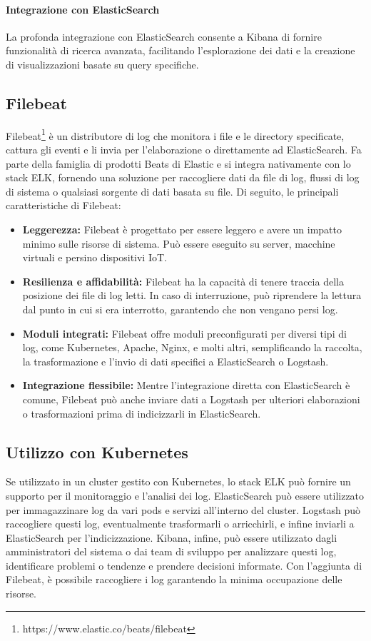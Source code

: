 \paragraph{Integrazione con ElasticSearch}

La profonda integrazione con ElasticSearch consente a Kibana di fornire funzionalità di ricerca avanzata, facilitando l'esplorazione dei dati e la creazione di visualizzazioni basate su query specifiche.


\subsection{Filebeat}

Filebeat\footnote{https://www.elastic.co/beats/filebeat} è un distributore di log che monitora i file e le directory specificate, cattura gli eventi e li invia per l'elaborazione o direttamente ad ElasticSearch. Fa parte della famiglia di prodotti Beats di Elastic e si integra nativamente con lo stack ELK, fornendo una soluzione per raccogliere dati da file di log, flussi di log di sistema o qualsiasi sorgente di dati basata su file. Di seguito, le principali caratteristiche di Filebeat:

\begin{itemize}
\item \textbf{Leggerezza:} Filebeat è progettato per essere leggero e avere un impatto minimo sulle risorse di sistema. Può essere eseguito su server, macchine virtuali e persino dispositivi IoT.
\item \textbf{Resilienza e affidabilità:} Filebeat ha la capacità di tenere traccia della posizione dei file di log letti. In caso di interruzione, può riprendere la lettura dal punto in cui si era interrotto, garantendo che non vengano persi log.
\item \textbf{Moduli integrati:} Filebeat offre moduli preconfigurati per diversi tipi di log, come Kubernetes, Apache, Nginx, e molti altri, semplificando la raccolta, la trasformazione e l'invio di dati specifici a ElasticSearch o Logstash.
\item \textbf{Integrazione flessibile:} Mentre l'integrazione diretta con ElasticSearch è comune, Filebeat può anche inviare dati a Logstash per ulteriori elaborazioni o trasformazioni prima di indicizzarli in ElasticSearch.
\end{itemize}

\subsection{Utilizzo con Kubernetes}
Se utilizzato in un cluster gestito con Kubernetes, lo stack ELK può fornire un supporto per il monitoraggio e l'analisi dei log. 
ElasticSearch può essere utilizzato per immagazzinare log da vari pods e servizi all'interno del cluster. Logstash può raccogliere questi log, eventualmente trasformarli o arricchirli, e infine inviarli a ElasticSearch per l'indicizzazione. Kibana, infine, può essere utilizzato dagli amministratori del sistema o dai team di sviluppo per analizzare questi log, identificare problemi o tendenze e prendere decisioni informate. Con l'aggiunta di Filebeat, è possibile raccogliere i log garantendo la minima occupazione delle risorse.

